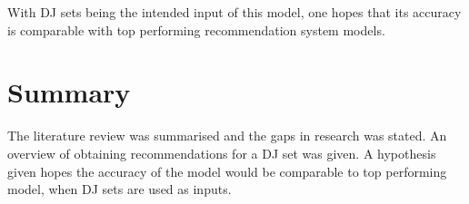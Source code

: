 With DJ sets being the intended input of this model, one hopes that its accuracy is comparable with top performing recommendation system models.

\section{Summary}
The literature review was summarised and the gaps in research was stated. An overview of obtaining recommendations for a DJ set was given. A hypothesis given  hopes the accuracy of the model would be comparable to top performing model, when DJ sets are used as inputs. 



